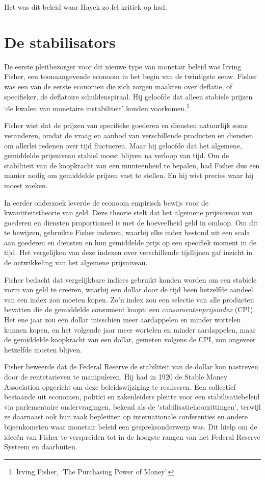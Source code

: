 \documentclass[smalldemyvopaper,11pt,twoside,onecolumn,openright,extrafontsizes,hidelinks]{memoir}
\begin{document}
Het was dit beleid waar Hayek zo fel kritiek op had.

\section{De stabilisators}\label{de-stabilisators}

De eerste pleitbezorger voor dit nieuwe type van monetair beleid was
Irving Fisher, een toonaangevende econoom in het begin van de twintigste
eeuw. Fisher was een van de eerste economen die zich zorgen maakten over
deflatie, of specifieker, de deflatoire schuldenspiraal. Hij geloofde
dat alleen stabiele prijzen `de kwalen van monetaire instabiliteit'
konden voorkomen.\footnote{\hspace{0pt}Irving Fisher, `The Purchasing
  Power of Money'.}

Fisher wist dat de prijzen van specifieke goederen en diensten
natuurlijk soms veranderen, omdat de vraag en aanbod van verschillende
producten en diensten om allerlei redenen over tijd fluctueren. Maar hij
geloofde dat het algemene, gemiddelde prijsniveau stabiel moest blijven
na verloop van tijd. Om de stabiliteit van de koopkracht van een
munteenheid te bepalen, had Fisher dus een manier nodig om gemiddelde
prijzen vast te stellen. En hij wist precies waar hij moest zoeken.

In eerder onderzoek leverde de econoom empirisch bewijs voor de
kwantiteitstheorie van geld. Deze theorie stelt dat het algemene
prijsniveau van goederen en diensten proportioneel is met de hoeveelheid
geld in omloop. Om dit te bewijzen, gebruikte Fisher indexen, waarbij
elke index bestond uit een scala aan goederen en diensten en hun
gemiddelde prijs op een specifiek moment in de tijd. Het vergelijken van
deze indexen over verschillende tijdlijnen gaf inzicht in de
ontwikkeling van het algemene prijsniveau.

Fisher bedacht dat vergelijkbare indices gebruikt konden worden om een
stabiele vorm van geld te creëren, waarbij een dollar door de tijd heen
hetzelfde aandeel van een index zou moeten kopen. Zo'n index zou een
selectie van alle producten bevatten die de gemiddelde consument koopt:
een \emph{consumentenprijsindex} (CPI). Het ene jaar zou een dollar
misschien meer aardappelen en minder wortelen kunnen kopen, en het
volgende jaar meer wortelen en minder aardappelen, maar de gemiddelde
koopkracht van een dollar, gemeten volgens de CPI, zou ongeveer
hetzelfde moeten blijven.

Fisher beweerde dat de Federal Reserve de stabiliteit van de dollar kon
nastreven door de rentetarieven te manipuleren. Hij had in 1920 de
Stable Money Association opgericht om deze beleidswijziging te
realiseren. Een collectief bestaande uit economen, politici en
zakenleiders pleitte voor een stabilisatiebeleid via parlementaire
ondervragingen, bekend als de `stabilisatiehoorzittingen', terwijl ze
daarnaast ook hun zaak bepleitten op internationale conferenties en
andere bijeenkomsten waar monetair beleid een gespreksonderwerp was. Dit
hielp om de ideeën van Fisher te verspreiden tot in de hoogste rangen
van het Federal Reserve Systeem en daarbuiten.
\end{document}
